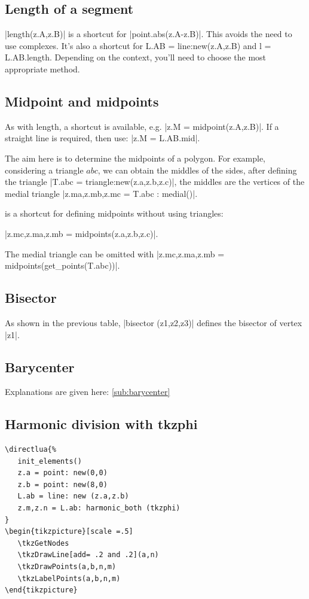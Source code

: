 \subsection{Length of a segment} %
\label{sub:length_of_a_segment}
|length(z.A,z.B)| is a shortcut for |point.abs(z.A-z.B)|. This avoids the need to use complexes.
It's also a shortcut for L.AB = line:new(z.A,z.B) and l = L.AB.length. Depending on the context, you'll need to choose the most appropriate method.


\subsection{Midpoint and midpoints} %
\label{sub:midpoint_and_midpoints}
As with length, a shortcut is available, e.g. |z.M = midpoint(z.A,z.B)|. If a straight line is required, then use: |z.M = L.AB.mid|.

The aim here is to determine the midpoints of a polygon. For example, considering a triangle $abc$, we can obtain the middles of the sides, after defining the triangle |T.abc = triangle:new(z.a,z.b,z.c)|, the middles are the vertices of the medial triangle |z.ma,z.mb,z.mc = T.abc : medial()|.

 is a shortcut for defining midpoints without using triangles:

 |z.mc,z.ma,z.mb = midpoints(z.a,z.b,z.c)|. 
 
 The medial triangle can be omitted with |z.mc,z.ma,z.mb = midpoints(get_points(T.abc))|.

\subsection{Bisector} %
\label{sub:bisector}
As shown in the previous table, |bisector (z1,z2,z3)| defines the bisector of vertex |z1|.

\subsection{Barycenter} %
\label{sub:misc_barycenter}

Explanations are given here: \ref{sub:barycenter}

\subsection{Harmonic division with tkzphi } %
\label{sub:harmonic_division_with_tkzphi}
\begin{Verbatim}
\directlua{%
   init_elements()
   z.a = point: new(0,0)
   z.b = point: new(8,0)
   L.ab = line: new (z.a,z.b)
   z.m,z.n = L.ab: harmonic_both (tkzphi)
}
\begin{tikzpicture}[scale =.5]
   \tkzGetNodes
   \tkzDrawLine[add= .2 and .2](a,n) 
   \tkzDrawPoints(a,b,n,m)
   \tkzLabelPoints(a,b,n,m)
\end{tikzpicture}
\end{Verbatim}


